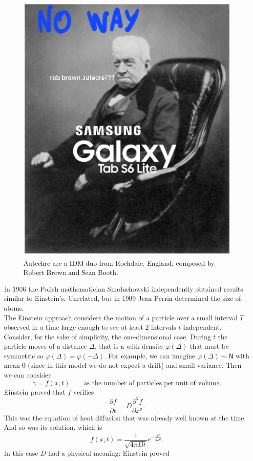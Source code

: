 \documentclass[12pt]{report}
\begin{document}
\begin{figure}[h]
	\centering
	\includegraphics[width=0.5\linewidth]{img/screenshot006}
	\caption{Autechre are a IDM duo from Rochdale, England, composed by Robert Brown and Sean Booth.}
	\label{fig:autecre}
\end{figure}
In 1906 the Polish mathematician Smoluchowski independently obtained results similar to Einstein's. Unrelated, but in 1909 Jean Perrin determined the size of atoms.\\
The Einstein approach considers the motion of a particle over a small interval $T$ observed in a time large enough to see at least 2 intervals $t$ independent. Consider, for the sake of simplicity, the one-dimensional case. During $t$ the particle moves of a distance $\Delta$, that is a \rv{} with density $\varphi(\Delta)$ that must be symmetric so $\varphi(\Delta)=\varphi(-\Delta)$. For example, we can imagine $\varphi(\Delta)\sim\mathsf{N}$ with mean 0 (since in this model we do not expect a drift) and small variance. Then we can consider
\begin{equation*}
	\gamma=f(x,t)\qquad\text{as the number of particles per unit of volume.}
\end{equation*}
Einstein proved that $f$ verifies
\begin{equation*}
	\frac{\partial f}{\partial t}=D\frac{\partial^{2}f}{\partial x^{2}}.
\end{equation*}
This was the equation of heat diffusion that was already well known at the time. And so was its solution, which is
\begin{equation*}
	f(x,t)=\frac{1}{\sqrt{4\pi Dt}}e^{-\frac{x^{2}}{4Dt}}.
\end{equation*}
In this case $D$ had a physical meaning: Einstein proved\par
\end{document}
